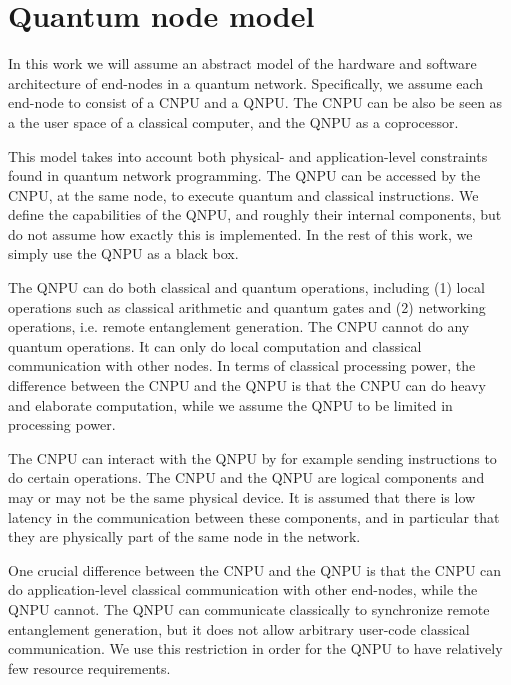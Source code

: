 \section{Quantum node model}
\label{netqasm:sec:abstract_model}

In this work we will assume an abstract model of the hardware and software architecture of end-nodes in a quantum network.
Specifically, we assume each end-node to consist of a \acf{CNPU} and a \acf{QNPU}.
The \ac{CNPU} can be also be seen as a the user space of a classical computer, and the \ac{QNPU} as a coprocessor.

This model takes into account both physical- and application-level constraints found in quantum network programming.
The \ac{QNPU} can be accessed by the \ac{CNPU}, at the same node, to execute quantum and classical instructions.
We define the capabilities of the \ac{QNPU}, and roughly their internal components, but do not assume how exactly this is implemented.
In the rest of this work, we simply use the \ac{QNPU} as a black box.

The \ac{QNPU} can do both classical and quantum operations, including
    (1) local operations such as classical arithmetic and quantum gates and
    (2) networking operations, i.e. remote entanglement generation.
The \ac{CNPU} cannot do any quantum operations.
It can only do local computation and classical communication with other nodes.
In terms of classical processing power, the difference between the \ac{CNPU} and the \ac{QNPU} is that the \ac{CNPU} can do heavy and elaborate computation, while we assume the \ac{QNPU} to be limited in processing power.

The \ac{CNPU} can interact with the \ac{QNPU} by for example sending instructions to do certain operations.
The \ac{CNPU} and the \ac{QNPU} are logical components and may or may not be the same physical device.
It is assumed that there is low latency in the communication between these components, and in particular that they are physically part of the same node in the network.

One crucial difference between the \ac{CNPU} and the \ac{QNPU} is that the \ac{CNPU} can do application-level classical communication with other end-nodes, while the \ac{QNPU} cannot.
The \ac{QNPU} can communicate classically to synchronize remote entanglement generation, but it does not allow arbitrary user-code classical communication.
We use this restriction in order for the \ac{QNPU} to have relatively few resource requirements.

